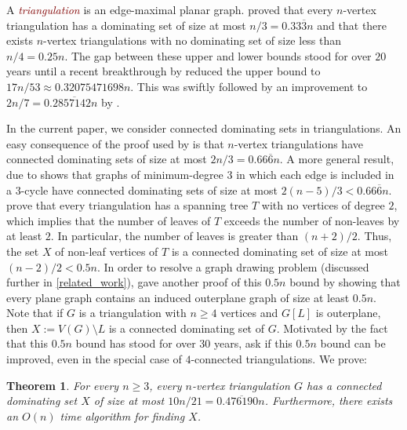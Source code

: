 \documentclass{article}
\newtheorem{thm}{Theorem}
\newcommand{\defin}[1]{\emph{\textcolor{Maroon}{#1}}}
\theoremstyle{definition}
\begin{document}
A \defin{triangulation} is an edge-maximal planar graph.  \citet{matheson.tarjan:dominating} proved that every $n$-vertex triangulation has a dominating set of size at most $n/3=0.33\overline{3}n$ and that there exists $n$-vertex triangulations with no dominating set of size less than $n/4=0.25n$. The gap between these upper and lower bounds stood for over $20$ years until a recent breakthrough by \citet{spacapan:domination} reduced the upper bound to $17n/53\approx 0.32075471698n$.  This was swiftly followed by an improvement to $2n/7= 0.2\overline{857142}n$ by \citet{christiansen.rotenberg.ea:triangulations}.

In the current paper, we consider connected dominating sets in triangulations.  An easy consequence of the proof used by \citet{matheson.tarjan:dominating} is that $n$-vertex triangulations have connected dominating sets of size at most $2n/3=0.66\overline{6}n$.  A more general result, due to  \citet{kleitman.west:spanning} shows that graphs of minimum-degree $3$ in which each edge is included in a $3$-cycle have connected dominating sets of size at most $2(n-5)/3<0.66\overline{6}n$. \citet{albertson.berman.ea:graphs} prove that every triangulation has a spanning tree $T$ with no vertices of degree $2$, which implies that the number of leaves of $T$ exceeds the number of non-leaves by at least $2$.  In particular, the number of leaves is greater than $(n+2)/2$. Thus, the set $X$ of non-leaf vertices of $T$ is a connected dominating set of size at most $(n-2)/2<0.5n$. In order to resolve a graph drawing problem (discussed further in \cref{related_work}), \citet{angelini.evans.ea:sefe} gave another proof of this $0.5n$ bound by showing that every plane graph contains an induced outerplane graph of size at least $0.5n$.  Note that if $G$ is a triangulation with $n\ge 4$ vertices and $G[L]$ is outerplane, then $X:=V(G)\setminus L$ is a connected dominating set of $G$. Motivated by the fact that this $0.5n$ bound has stood for over 30 years, \citet{noguchi.zamfirescu:spanning} ask if this $0.5n$ bound can be improved, even in the special case of $4$-connected triangulations. We prove:

\begin{thm}\label{main_result2}
  For every $n\ge 3$, every $n$-vertex triangulation $G$ has a connected dominating set $X$ of size at most $10n/21= 0.\overline{476190}n$.  Furthermore, there exists an $O(n)$ time algorithm for finding $X$.
\end{thm}
\end{document}
